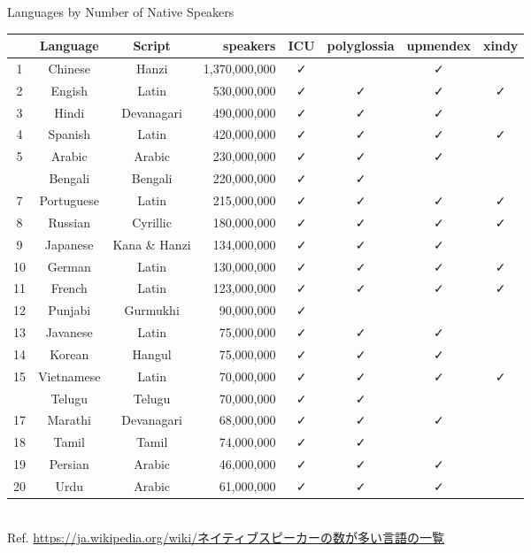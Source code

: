 \documentclass[aspectratio=169,10pt]{beamer}
\newcommand{\colRd}{\color{purple}}
\newcommand{\colGn}{\color{teal}}
\newcommand{\colBl}{\color{blue}}
\begin{document}
\begin{frame}{Languages by Number of Native Speakers}

\setlength\dashlinedash{0.5pt}
\setlength\dashlinegap{1.0pt}

\begin{center}
\scriptsize
\begin{tabular}{ccc|r|cccc}
  & Language    & Script & speakers & ICU & polyglossia & upmendex & xindy \\\hline\hline
1 & Chinese     & {\colRd Hanzi     } & 1,370,000,000 & ✓ &    & ✓ &    \\
2 & Engish      & Latin      &   530,000,000 & ✓ & ✓ & ✓ & ✓ \\
3 & Hindi       & {\colBl Devanagari} &   490,000,000 & ✓ & ✓ & ✓ &    \\
4 & Spanish     & Latin      &   420,000,000 & ✓ & ✓ & ✓ & ✓ \\
5 & Arabic      & {\colGn Arabic    } &   230,000,000 & ✓ & ✓ & ✓ &    \\\hdashline
6 & Bengali     & {\colBl Bengali   } &   220,000,000 & ✓ & ✓ &    &    \\
7 & Portuguese  & Latin      &   215,000,000 & ✓ & ✓ & ✓ & ✓ \\
8 & Russian     & Cyrillic   &   180,000,000 & ✓ & ✓ & ✓ & ✓ \\
9 & Japanese    & {\colRd Kana \& Hanzi } &   134,000,000 & ✓ & ✓ & ✓ &    \\
10 & German     & Latin      &   130,000,000 & ✓ & ✓ & ✓ & ✓ \\\hline
11 & French     & Latin      &   123,000,000 & ✓ & ✓ & ✓ & ✓ \\
12 & Punjabi    & {\colBl Gurmukhi  } &    90,000,000 & ✓ &    &    &    \\
13 & Javanese   & Latin      &    75,000,000 & ✓ & ✓ & ✓ &    \\
14 & Korean     & {\colRd Hangul    } &    75,000,000 & ✓ & ✓ & ✓ &    \\
15 & Vietnamese & Latin      &    70,000,000 & ✓ & ✓ & ✓ & ✓ \\\hdashline
16 & Telugu     & {\colBl Telugu    } &    70,000,000 & ✓ & ✓ &    &    \\
17 & Marathi    & {\colBl Devanagari} &    68,000,000 & ✓ & ✓ & ✓ &    \\
18 & Tamil      & {\colBl Tamil     } &    74,000,000 & ✓ & ✓ &    &    \\
19 & Persian    & {\colGn Arabic    } &    46,000,000 & ✓ & ✓ & ✓ &    \\
20 & Urdu       & {\colGn Arabic    } &    61,000,000 & ✓ & ✓ & ✓ &    \\\hline
\end{tabular}
\\
{\tiny Ref. \url{https://ja.wikipedia.org/wiki/ネイティブスピーカーの数が多い言語の一覧}}
\end{center}
\end{frame}
\end{document}
